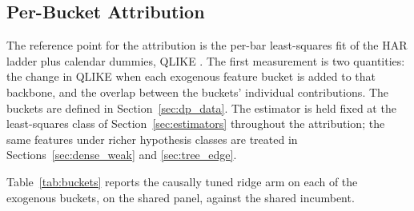 
\subsection{Per-Bucket Attribution}
\label{sec:buckets}

The reference point for the attribution is the per-bar least-squares
fit of the HAR ladder plus calendar dummies, QLIKE \unifAzeroQLIKE{}.
The first measurement is two quantities: the change in QLIKE when each
exogenous feature bucket is added to that backbone, and the overlap
between the buckets' individual contributions. The buckets are defined
in Section~\ref{sec:dp_data}. The estimator is held fixed at the
least-squares class of Section~\ref{sec:estimators} throughout the
attribution; the same features under richer hypothesis classes are
treated in Sections~\ref{sec:dense_weak} and \ref{sec:tree_edge}.

Table~\ref{tab:buckets} reports the causally tuned ridge arm on each of the
exogenous buckets, on the shared panel, against the shared incumbent.

